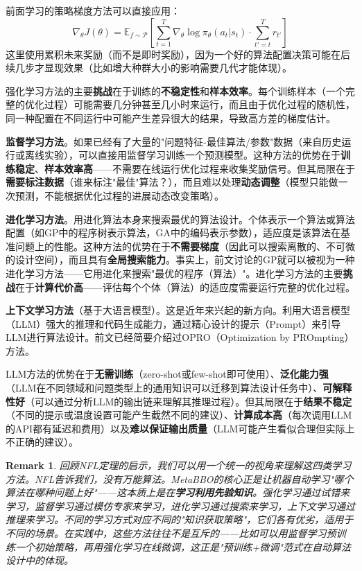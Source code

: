 \documentclass[lang=cn,zihao=-4,a4paper,fontset=windows]{beautybook}
\newtheorem*{remark}{\textbf{Remark}}
\begin{document}
前面学习的策略梯度方法可以直接应用：
\[
\nabla_\theta J(\theta) = \mathbb{E}_{f \sim \mathcal{P}} \left[ \sum_{t=1}^{T} \nabla_\theta \log \pi_\theta(a_t | s_t) \cdot \sum_{t'=t}^{T} r_{t'} \right]
\]
这里使用累积未来奖励（而不是即时奖励），因为一个好的算法配置决策可能在后续几步才显现效果（比如增大种群大小的影响需要几代才能体现）。

强化学习方法的主要\textbf{挑战}在于训练的\textbf{不稳定性}和\textbf{样本效率}。每个训练样本（一个完整的优化过程）可能需要几分钟甚至几小时来运行，而且由于优化过程的随机性，同一种配置在不同运行中可能产生差异很大的结果，导致高方差的梯度估计。

\textbf{监督学习方法}。如果已经有了大量的"问题特征-最佳算法/参数"数据（来自历史运行或离线实验），可以直接用监督学习训练一个预测模型。这种方法的优势在于\textbf{训练稳定}、\textbf{样本效率高}——不需要在线运行优化过程来收集奖励信号。但其局限在于\textbf{需要标注数据}（谁来标注"最佳"算法？），而且难以处理\textbf{动态调整}（模型只能做一次预测，不能根据优化过程的进展动态改变策略）。

\textbf{进化学习方法}。用进化算法本身来搜索最优的算法设计。个体表示一个算法或算法配置（如GP中的程序树表示算法，GA中的编码表示参数），适应度是该算法在基准问题上的性能。这种方法的优势在于\textbf{不需要梯度}（因此可以搜索离散的、不可微的设计空间），而且具有\textbf{全局搜索能力}。事实上，前文讨论的GP就可以被视为一种进化学习方法——它用进化来搜索"最优的程序（算法）"。进化学习方法的主要\textbf{挑战}在于\textbf{计算代价高}——评估每个个体（算法）的适应度需要运行完整的优化过程。

\textbf{上下文学习方法}（基于大语言模型）。这是近年来兴起的新方向。利用大语言模型（LLM）强大的推理和代码生成能力，通过精心设计的提示（Prompt）来引导LLM进行算法设计。前文已经简要介绍过OPRO（Optimization by PROmpting）方法。

LLM方法的优势在于\textbf{无需训练}（zero-shot或few-shot即可使用）、\textbf{泛化能力强}（LLM在不同领域和问题类型上的通用知识可以迁移到算法设计任务中）、\textbf{可解释性好}（可以通过分析LLM的输出链来理解其推理过程）。但其局限在于\textbf{结果不稳定}（不同的提示或温度设置可能产生截然不同的建议）、\textbf{计算成本高}（每次调用LLM的API都有延迟和费用）以及\textbf{难以保证输出质量}（LLM可能产生看似合理但实际上不正确的建议）。

\begin{remark}
回顾NFL定理的启示，我们可以用一个统一的视角来理解这四类学习方法。NFL告诉我们，没有万能算法。MetaBBO的核心正是让机器自动学习"哪个算法在哪种问题上好"——这本质上是在\textbf{学习利用先验知识}。强化学习通过试错来学习，监督学习通过模仿专家来学习，进化学习通过搜索来学习，上下文学习通过推理来学习。不同的学习方式对应不同的"知识获取策略"，它们各有优劣，适用于不同的场景。在实践中，这些方法往往不是互斥的——比如可以用监督学习预训练一个初始策略，再用强化学习在线微调，这正是"预训练+微调"范式在自动算法设计中的体现。
\end{remark}
\end{document}
